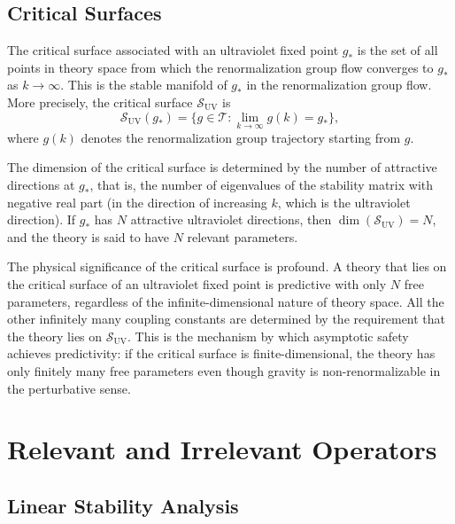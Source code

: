 \documentclass[11pt, twoside, openright]{book}
\theoremstyle{dotted}
\theoremstyle{definition}
\newcommand{\cT}{\mathcal{T}}          %
\newcommand{\cS}{\mathcal{S}}          %
\newcommand{\UV}{\mathrm{UV}}          %
\begin{document}
\section{Critical Surfaces}

The critical surface associated with an ultraviolet fixed point $g_*$ is the set
of all points in theory space from which the renormalization group flow converges
to $g_*$ as $k \to \infty$. This is the stable manifold of $g_*$ in the
renormalization group flow. More precisely, the critical surface $\cS_{\UV}$ is
\begin{equation}
  \cS_{\UV}(g_*) = \{g \in \cT : \lim_{k\to\infty} g(k) = g_*\},
  \label{eq:critical_surface}
\end{equation}
where $g(k)$ denotes the renormalization group trajectory starting from $g$.

The dimension of the critical surface is determined by the number of attractive
directions at $g_*$, that is, the number of eigenvalues of the stability matrix
with negative real part (in the direction of increasing $k$, which is the ultraviolet
direction). If $g_*$ has $N$ attractive ultraviolet directions, then
$\dim(\cS_{\UV}) = N$, and the theory is said to have $N$ relevant parameters.

The physical significance of the critical surface is profound. A theory that lies
on the critical surface of an ultraviolet fixed point is predictive with only $N$
free parameters, regardless of the infinite-dimensional nature of theory space.
All the other infinitely many coupling constants are determined by the requirement
that the theory lies on $\cS_{\UV}$. This is the mechanism by which asymptotic
safety achieves predictivity: if the critical surface is finite-dimensional, the
theory has only finitely many free parameters even though gravity is
non-renormalizable in the perturbative sense.

\chapter{Relevant and Irrelevant Operators}
\label{ch:relevant_irrelevant}

\section{Linear Stability Analysis}
\end{document}
